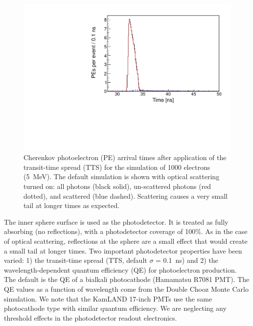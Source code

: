 \documentclass[cits]{JINST}
\begin{document}
\begin{figure}
        \begin{center}
        \includegraphics[scale=0.4]{graphs2/PEtime_Cerenkov_scattered_vs_unscattered.pdf}
        \caption[]{Cherenkov photoelectron (PE) arrival times after application
        of the transit-time spread (TTS) for the simulation
        of 1000 electrons (5~MeV). The default simulation is shown with optical scattering turned on: all photons (black solid), un-scattered photons (red dotted), and scattered (blue dashed). Scattering causes a very small tail at longer times as expected. \label{scattplot}}
        \end{center}
\end{figure}

The inner sphere surface is used as the photodetector. It is treated
as fully absorbing (no reflections), with a photodetector coverage of
100\%. As in the case of optical scattering, reflections at the sphere are a small effect that would create a small tail at longer times. Two important photodetector properties have been varied: 1)
the transit-time spread (TTS, default $\sigma$ = 0.1~ns) and 2) the
wavelength-dependent quantum efficiency (QE) for photoelectron
production. The default is the QE of a bialkali photocathode (Hamamatsu
R7081 PMT)\cite{Hamamatsu_R7081}. The QE values as a function of wavelength come from the Double Chooz\cite{dctwo}
Monte Carlo simulation. We note that the KamLAND 17-inch PMTs use the
same photocathode type with similar quantum efficiency. We are neglecting any threshold effects in the photodetector readout electronics.
\end{document}
